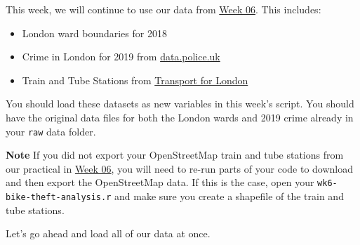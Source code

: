 \documentclass[
]{book}
\providecommand{\tightlist}{%
  \setlength{\itemsep}{0pt}\setlength{\parskip}{0pt}}
\begin{document}
This week, we will continue to use our data from \protect\hyperlink{analysing-spatial-patterns-i-geometric-operations-and-spatial-queries.html}{Week 06}. This includes:

\begin{itemize}
\tightlist
\item
  London ward boundaries for 2018
\item
  Crime in London for 2019 from \href{https://data.police.uk/}{data.police.uk}
\item
  Train and Tube Stations from \href{https://tfl.gov.uk/}{Transport for London}
\end{itemize}

You should load these datasets as new variables in this week's script. You should have the original data files for both the London wards and 2019 crime already in your \texttt{raw} data folder.

\textbf{Note}
If you did not export your OpenStreetMap train and tube stations from our practical in \protect\hyperlink{analysing-spatial-patterns-i-geometric-operations-and-spatial-queries.html}{Week 06}, you will need to re-run parts of your code to download and then export the OpenStreetMap data. If this is the case, open your \texttt{wk6-bike-theft-analysis.r} and make sure you create a shapefile of the train and tube stations.

Let's go ahead and load all of our data at once.
\end{document}
